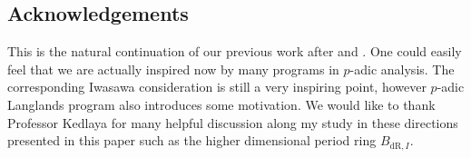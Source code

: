 \documentclass[12pt]{amsart}
\theoremstyle{definition}
\numberwithin{equation}{section}
\begin{document}
\newpage

\subsection*{Acknowledgements} 


This is the natural continuation of our previous work \cite{T1} after \cite{CKZ} and \cite{PZ}. One could easily feel that we are actually inspired now by many programs in $p$-adic analysis. The corresponding Iwasawa consideration is still a very inspiring point, however $p$-adic Langlands program also introduces some motivation. We would like to thank Professor Kedlaya for many helpful discussion along my study in these directions presented in this paper such as the higher dimensional period ring $B_{\mathrm{dR},I}$.






\newpage
\end{document}
